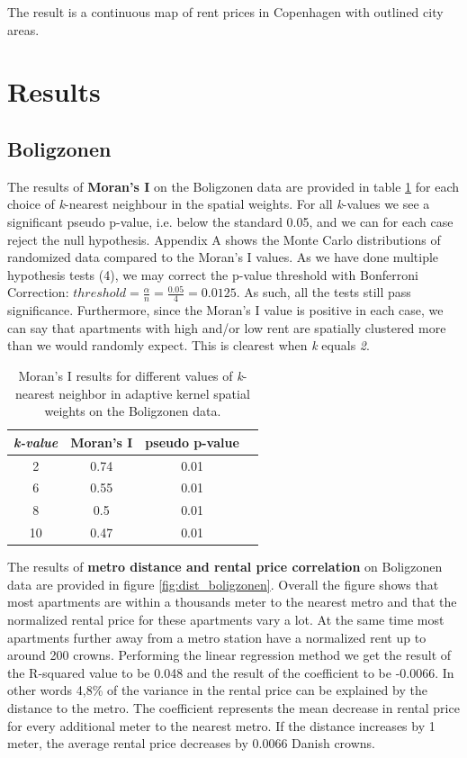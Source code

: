 \documentclass{article}
\begin{document}
The result is a continuous map of rent prices in Copenhagen with outlined city areas.




\section{Results}

\subsection{Boligzonen}

The results of \textbf{Moran's I} on the Boligzonen data are provided in table \ref{morans_I} for each choice of \textit{k}-nearest neighbour in the spatial weights. For all \textit{k}-values we see a significant pseudo p-value, i.e. below the standard 0.05, and we can for each case reject the null hypothesis. Appendix A shows the Monte Carlo distributions of randomized data compared to the Moran's I values. As we have done multiple hypothesis tests (4), we may correct the p-value threshold with Bonferroni Correction: $threshold = \frac{\alpha}{n} = \frac{0.05}{4} = 0.0125$. As such, all the tests still pass significance. Furthermore, since the Moran's I value is positive in each case, we can say that apartments with high and/or low rent are spatially clustered more than we would randomly expect. This is clearest when \textit{k} equals \textit{2}.

\begin{table}[H]
\renewcommand{\arraystretch}{1.3}
\label{morans_I}
\centering
\begin{tabular}{|c|c|c|c|}
\hline
\bfseries \textit{k-value} & \bfseries Moran's I & \bfseries pseudo p-value\\
\hline\hline
2 & 0.74 & 0.01 \\
6 & 0.55 & 0.01 \\
8 & 0.5 & 0.01 \\
10 & 0.47 & 0.01 \\
\hline
\end{tabular}
\caption{Moran's I results for different values of \textit{k}-nearest neighbor in adaptive kernel spatial weights on the Boligzonen data.}
\end{table}



The results of \textbf{metro distance and rental price correlation} on Boligzonen data are provided in figure \ref{fig:dist_boligzonen}. Overall the figure shows that most apartments are within a thousands meter to the nearest metro and that the normalized rental price for these apartments vary a lot. At the same time most apartments further away from a metro station have a normalized rent up to around 200 crowns. Performing the linear regression method we get the result of the R-squared value to be 0.048 and the result of the coefficient to be -0.0066. In other words 4,8\% of the variance in the rental price can be explained by the distance to the metro. The coefficient represents the mean decrease in rental price for every additional meter to the nearest metro. If the distance increases by 1 meter, the average rental price decreases by 0.0066 Danish crowns.
\end{document}
